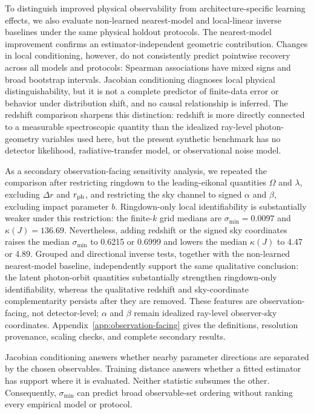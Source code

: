 \documentclass[11pt]{article}
\newcommand{\smin}{\sigma_{\min}}
\newcommand{\kappaJ}{\kappa(J)}
\begin{document}
To distinguish improved physical observability from architecture-specific
learning effects, we also evaluate non-learned nearest-model and local-linear
inverse baselines under the same physical holdout protocols. The nearest-model
improvement confirms an estimator-independent geometric contribution. Changes
in local conditioning, however, do not consistently predict pointwise recovery
across all models and protocols: Spearman associations have mixed signs and
broad bootstrap intervals. Jacobian conditioning diagnoses local physical
distinguishability, but it is not a complete predictor of finite-data error or
behavior under distribution shift, and no causal relationship is inferred.
The redshift comparison sharpens this distinction: redshift is more directly
connected to a measurable spectroscopic quantity than the idealized ray-level
photon-geometry variables used here, but the present synthetic benchmark has no
detector likelihood, radiative-transfer model, or observational noise model.

As a secondary observation-facing sensitivity analysis, we repeated the
comparison after restricting ringdown to the leading-eikonal quantities
$\Omega$ and $\lambda$, excluding $\Delta r$ and $r_{\rm ph}$, and restricting
the sky channel to signed $\alpha$ and $\beta$, excluding impact parameter
$b$. Ringdown-only local identifiability is substantially weaker under this
restriction: the finite-$k$ grid medians are $\smin=0.0097$ and
$\kappaJ=136.69$. Nevertheless, adding redshift or the signed sky coordinates
raises the median $\smin$ to 0.6215 or 0.6999 and lowers the median $\kappaJ$
to 4.47 or 4.89. Grouped and directional inverse tests, together with the
non-learned nearest-model baseline, independently support the same qualitative
conclusion: the latent photon-orbit quantities substantially strengthen
ringdown-only identifiability, whereas the qualitative redshift and
sky-coordinate complementarity persists after they are removed. These features
are observation-facing, not detector-level;
$\alpha$ and $\beta$ remain idealized ray-level observer-sky coordinates.
Appendix~\ref{app:observation-facing} gives the definitions, resolution
provenance, scaling checks, and complete secondary results.

Jacobian conditioning answers whether nearby parameter directions are separated
by the chosen observables. Training distance answers whether a fitted estimator
has support where it is evaluated. Neither statistic subsumes the other.
Consequently, $\smin$ can predict broad observable-set ordering without ranking
every empirical model or protocol.
\end{document}
